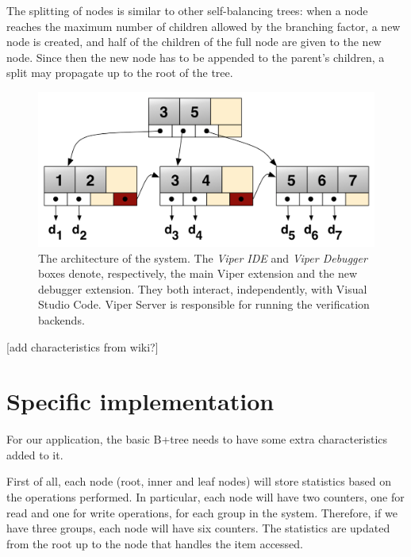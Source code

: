 The splitting of nodes is similar to other self-balancing trees: when a node reaches the maximum number of children allowed by the branching factor, a new node is created, and half of the children of the full node are given to the new node. Since then the new node has to be appended to the parent's children, a split may propagate up to the root of the tree.

\begin{figure}[htb]
    \centering
    \includegraphics[width=\textwidth,height=\textheight,keepaspectratio]{img/b+tree.png}
    \caption[The architecture of the system]{ The architecture of the system. The
      \textit{Viper IDE} and \textit{Viper Debugger} boxes denote, respectively,
      the main Viper extension and the new debugger extension. They both interact,
      independently, with Visual Studio Code. Viper Server is responsible for
      running the verification backends.}
    \label{fig:b+tree}
\end{figure}

[add characteristics from wiki?]

\section{Specific implementation}\label{sec:specific-implementation}
For our application, the basic B+tree needs to have some extra characteristics added to it. 

First of all, each node (root, inner and leaf nodes) will store statistics based on the operations performed. In particular, each node will have two counters, one for read and one for write operations, for each group in the system. Therefore, if we have three groups, each node will have six counters. The statistics are updated from the root up to the node that handles the item accessed.


